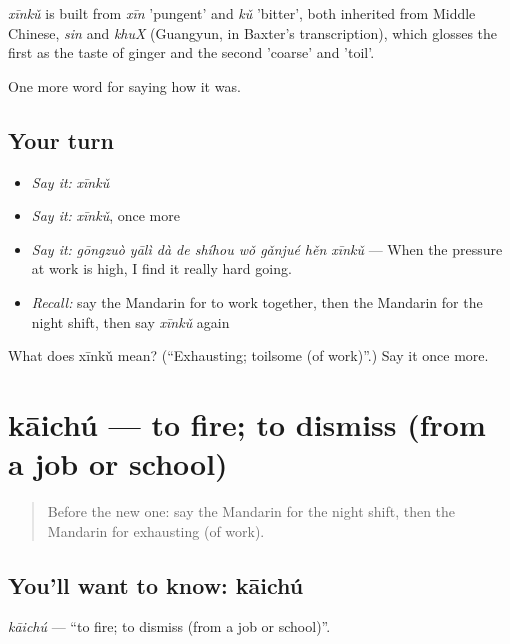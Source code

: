 \begin{cousinweb}
\emph{xīnkǔ} is built from \emph{xīn} 'pungent' and \emph{kǔ} 'bitter', both inherited from Middle Chinese, \emph{sin} and \emph{khuX} (Guangyun, in Baxter's transcription), which glosses the first as the taste of ginger and the second 'coarse' and 'toil'.
\end{cousinweb}

\begin{grammarlens}[title={What you've built}]
One more word for saying how it was.
\end{grammarlens}

\subsection*{Your turn}
\begin{itemize}
\raggedright
  \item \emph{Say it:} \emph{xīnkǔ}
  \item \emph{Say it:} \emph{xīnkǔ}, once more
  \item \emph{Say it:} \emph{gōngzuò yālì dà de shíhou wǒ gǎnjué hěn xīnkǔ} — When the pressure at work is high, I find it really hard going.
  \item \emph{Recall:} say the Mandarin for to work together, then the Mandarin for the night shift, then say \emph{xīnkǔ} again
\end{itemize}

\begin{tcolorbox}[breakable,colback=teal!4,colframe=teal!35!black,title={Before you move on}]
What does xīnkǔ mean? (\textquotedblleft{}Exhausting; toilsome (of work)\textquotedblright{}.) Say it once more.
\end{tcolorbox}
\section[kāichú]{kāichú — to fire; to dismiss (from a job or school)}

\label{lesson:ZH-C490-kaichu}



\begin{quote}
Before the new one: say the Mandarin for the night shift, then the Mandarin for exhausting (of work).
\end{quote}

\subsection*{You'll want to know: kāichú}
\emph{kāichú} — \textquotedblleft{}to fire; to dismiss (from a job or school)\textquotedblright{}.

